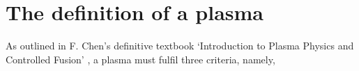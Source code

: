 


\section{\label{sec:plasma_def}The definition of a plasma}
As outlined in F. Chen's definitive textbook `Introduction to Plasma Physics and Controlled Fusion' \cite{chenIntroductionPlasmaPhysics2016}, a plasma must fulfil three criteria, namely,

